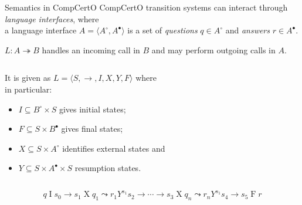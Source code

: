 \documentclass[aspectratio=1610,12pt]{beamer}
\newcommand{\que}{\circ}
\newcommand{\ans}{\bullet}
\begin{document}
\begin{frame}{Semantics in CompCertO} %
  CompCertO transition systems can interact through \emph{language interfaces},
  where \\ a language interface $A = \langle A^\circ, A^\bullet \rangle$
  is a set of \emph{questions} $q \in A^\circ$
  and \emph{answers} $r \in A^\bullet$.

  \vfill
  $L : A \twoheadrightarrow B$
  handles an incoming call in $B$ and
  may perform outgoing calls in $A$.

  \vfill
  \begin{columns}
    \begin{column}{0.55\textwidth}
      It is given as $L = \langle S, {\rightarrow}, I, X, Y, F \rangle$ where
      \\ in particular:
      \begin{itemize}
        \item $I \subseteq B^\circ \times S$ gives initial states;
        \item $F \subseteq S \times B^\bullet$ gives final states;
        \item $X \subseteq S \times A^\circ$ identifies external states and
        \item $Y \subseteq S \times A^\bullet \times S$ resumption states.
      \end{itemize}
    \end{column}
    \begin{column}{0.35\textwidth}
    \end{column}
  \end{columns}

  \vfill
  \[
    q \mathrel{I} s_0 \rightarrow s_1 \mathrel{X} q_1 \leadsto r_1 \mathrel{Y^{s_1}} s_2
                      \rightarrow \cdots
                      \rightarrow s_3 \mathrel{X} q_n \leadsto r_n \mathrel{Y^{s_1}} s_4
                      \rightarrow s_5 \mathrel{F} r
  \]
\end{frame}
\end{document}
